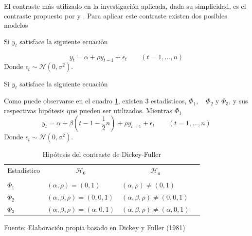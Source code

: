 \documentclass[12pt, twoside]{book}\usepackage[]{graphicx}\usepackage[]{color}
\numberwithin{equation}{section}
\numberwithin{theorem}{section}
\numberwithin{teorema}{section}
\numberwithin{defi}{section}
\numberwithin{prop}{section}
\numberwithin{defi}{section}
\theoremstyle{plain}
\begin{document}
El contraste más utilizado en la investigación aplicada, dada su simplicidad, es el contraste propuesto por \cite{fuller1976} y \cite{dickey1981}. Para aplicar este contraste existen dos posibles modelos 

Si $y_{t}$ satisface la siguiente ecuación

\begin{equation}
y_{t} = \alpha+\rho y_{t-1}+\epsilon_{t}\qquad (t=1,...,n)
\end{equation}
Donde $\epsilon_{t}\sim \mathcal{N}(0,\sigma^{2})$. 

Si $y_{t}$ satisface la siguiente ecuación 

Como puede observarse en el cuadro \ref{tab-1}, existen 3 estadísticos, $\Phi_{1},\quad \Phi_{2}$ y $\Phi_{3}$, y sus respectivas hipótesis que pueden ser utilizados. Mientras $\Phi_{1}$
\begin{equation}
y_{t} = \alpha+\beta\left(t-1-\frac{1}{2}n\right)+\rho y_{t-1}+\epsilon_{t}\qquad (t=1,...,n)
\end{equation}
Donde $\epsilon_{t}\sim \mathcal{N}(0,\sigma^{2})$. 

\begin{table}[h]
\centering
\begin{threeparttable}
\caption{Hipótesis del contraste de Dickey-Fuller}
\begin{tabular}{@{}llrllll@{}}
\toprule
\multicolumn{2}{l}{Estadístico} & \multicolumn{2}{c}{$\mathcal{H}_{0}$} &
\multicolumn{2}{c}{$\mathcal{H}_{a}$} \\
\cmidrule(l){3-4} \cmidrule(l){5-6} \\
\multicolumn{2}{l}{$\Phi_{1}$} &
\multicolumn{2}{l}{$(\alpha,\rho)=(0,1)$} &
\multicolumn{2}{l}{$(\alpha,\rho)\neq(0,1)$} \\
\multicolumn{2}{l}{$\Phi_{2}$} &
\multicolumn{2}{l}{$(\alpha,\beta, \rho)=(0,0,1)$} &
\multicolumn{2}{l}{$(\alpha,\beta,\rho)\neq(0,0,1)$} \\
\multicolumn{2}{l}{$\Phi_{3}$} &
\multicolumn{2}{l}{$(\alpha,\beta, \rho)=(\alpha,0,1)$} &
\multicolumn{2}{l}{$(\alpha,\beta,\rho)\neq(\alpha,0,1)$} \\
\bottomrule
\end{tabular}
\label{tab-1}
\begin{tablenotes}
\small
\item Fuente: Elaboración propia basado en Dickey y Fuller (1981)
\end{tablenotes}
\end{threeparttable}
\end{table}
\end{document}
